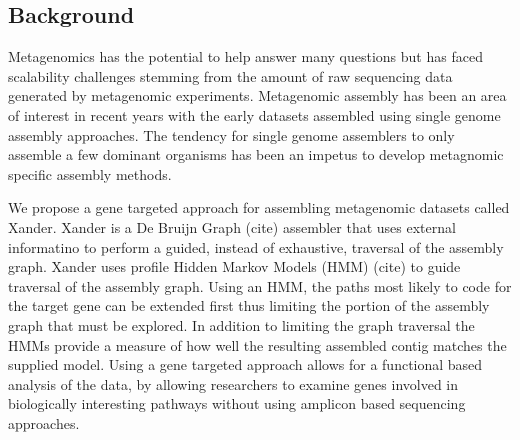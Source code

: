 \documentclass[10pt]{bmc_article}
\newenvironment{bmcformat}{\begin{raggedright}\baselineskip20pt\sloppy\setboolean{publ}{false}}{\end{raggedright}\baselineskip20pt\sloppy}
\begin{document}
\begin{bmcformat}




\section*{Background}
Metagenomics has the potential to help answer many questions but has faced scalability challenges stemming from the amount of raw sequencing data generated by metagenomic experiments\cite{Pop01072009,Salzberg01032012}.  Metagenomic assembly has been an area of interest in recent years with the early datasets assembled using single genome assembly approaches.  The tendency for single genome assemblers to only assemble a few dominant organisms has been an impetus to develop metagnomic specific assembly methods. 

We propose a gene targeted approach for assembling metagenomic datasets called Xander.  Xander is a De Bruijn Graph (cite) assembler that uses external informatino to perform a guided, instead of exhaustive, traversal of the assembly graph.  Xander uses profile Hidden Markov Models (HMM) (cite) to guide traversal of the assembly graph. Using an HMM, the paths most likely to code for the target gene can be extended first thus limiting the portion of the assembly graph that must be explored.  In addition to limiting the graph traversal the HMMs provide a measure of how well the resulting assembled contig matches the supplied model.  Using a gene targeted approach allows for a functional based analysis of the data, by allowing researchers to examine genes involved in biologically interesting pathways without using amplicon based sequencing approaches.


\end{bmcformat}
\end{document}

